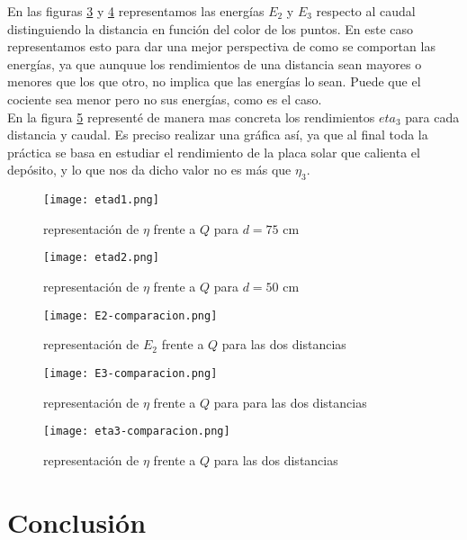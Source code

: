 \documentclass[12pt,a4paper]{article}
\begin{document}
En las figuras \ref{Fig:plot-13} y \ref{Fig:plot-14} representamos las  energías $E_2$ y $E_3$ respecto al caudal distinguiendo la distancia en función del color de los puntos. En este caso representamos esto para dar una mejor perspectiva de como se comportan las energías, ya que aunquue los rendimientos de una distancia sean mayores o menores que los que otro, no implica que las energías lo sean. Puede que el cociente sea menor pero no sus  energías, como es el caso. \\


En la figura \ref{Fig:plot-15} representé de manera mas concreta los rendimientos $eta_3$ para cada distancia y caudal. Es preciso realizar una gráfica así, ya que al final toda la práctica se basa en estudiar el rendimiento de la placa solar que calienta el depósito, y lo que nos da dicho valor no es más que $\eta_3$. 


\begin{figure}[h!] 	 \centering 
\texttt{[image: etad1.png]} 
\caption{representación de $\eta$ frente a $Q$ para  $d = 75$ cm} 
\label{Fig:plot-11}  
\end{figure} 

\newpage

\begin{figure}[h!] 	 \centering 
\texttt{[image: etad2.png]} 
\caption{representación de $\eta$ frente a $Q$ para  $d = 50$ cm} 
\label{Fig:plot-12}  
\end{figure} 

\begin{figure}[h!] 	 \centering 
\texttt{[image: E2-comparacion.png]} 
\caption{representación de $E_2$ frente a $Q$ para las dos distancias} 
\label{Fig:plot-13}  
\end{figure} 

\newpage

\begin{figure}[h!] 	 \centering 
\texttt{[image: E3-comparacion.png]} 
\caption{representación de $\eta$ frente a $Q$ para para las dos distancias} 
\label{Fig:plot-14}  
\end{figure} 

\begin{figure}[h!] 	 \centering 
\texttt{[image: eta3-comparacion.png]} 
\caption{representación de $\eta$ frente a $Q$ para las dos distancias} 
\label{Fig:plot-15}  
\end{figure} 

\newpage

\section{Conclusión}
\end{document}
